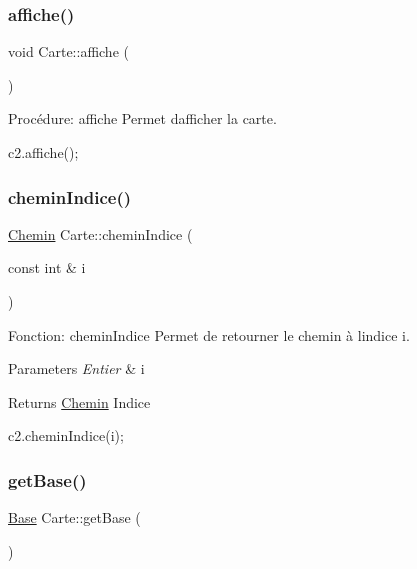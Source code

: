 \subsubsection{\texorpdfstring{affiche()}{affiche()}}
{\footnotesize\ttfamily void Carte\+::affiche (\begin{DoxyParamCaption}{ }\end{DoxyParamCaption})}



Procédure\+: affiche Permet d\textquotesingle{}afficher la carte. 


\begin{DoxyCode}
c2.affiche();
\end{DoxyCode}
 \mbox{\label{classCarte_aaab8126dc81caed5a8e38772d84b60e4}} 
\subsubsection{\texorpdfstring{chemin\+Indice()}{cheminIndice()}}
{\footnotesize\ttfamily \hyperlink{classChemin}{Chemin} Carte\+::chemin\+Indice (\begin{DoxyParamCaption}\item[{const int \&}]{i }\end{DoxyParamCaption})}



Fonction\+: chemin\+Indice Permet de retourner le chemin à l\textquotesingle{}indice i. 


\begin{DoxyParams}{Parameters}
{\em Entier} & i \\
\hline
\end{DoxyParams}
\begin{DoxyReturn}{Returns}
\hyperlink{classChemin}{Chemin} Indice 
\begin{DoxyCode}
c2.cheminIndice(i);
\end{DoxyCode}
 
\end{DoxyReturn}
\mbox{\label{classCarte_af76239ad9a307cf94ba0916ea477a331}} 
\subsubsection{\texorpdfstring{get\+Base()}{getBase()}}
{\footnotesize\ttfamily \hyperlink{classBase}{Base} Carte\+::get\+Base (\begin{DoxyParamCaption}{ }\end{DoxyParamCaption})}



